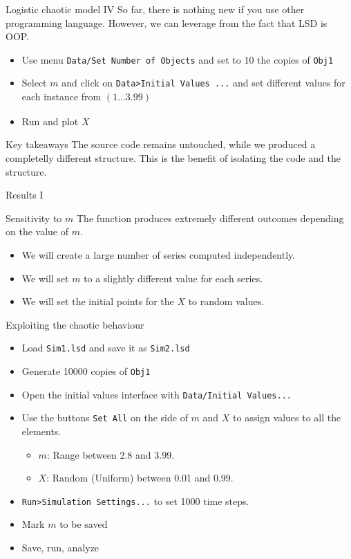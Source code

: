 \documentclass[bigger,aspectratio=169]{beamer}
\begin{document}
\begin{frame}[label={sec:orga6ac1ef},fragile]{Logistic chaotic model IV}
 So far, there is nothing new if you use other programming language.
However, we can leverage from the fact that LSD is OOP.

\begin{itemize}
\item Use menu \texttt{Data/Set Number of Objects} and set to 10 the copies of \texttt{Obj1}
\item Select \(m\) and click on \texttt{Data>Initial Values ...} and set different values for each instance from \((1 \ldots 3.99)_{}\)
\item Run and plot \(X\)
\end{itemize}
\begin{block}{Key takeaways}
The source code remains untouched, while we produced a completelly different structure.
This is the benefit of isolating the code and the structure.
\end{block}
\end{frame}
\begin{frame}[label={sec:org96a401d}]{Results I}
\begin{center}

\end{center}
\end{frame}
\begin{frame}[label={sec:org313bff8}]{Sensitivity to \(m\)}
The function produces \alert{extremely} different outcomes depending on the value of \alert{\(m\)}.

\begin{itemize}
\item We will create a large number of series computed independently.
\item We will set \(m\) to a slightly different value for each series.
\item We will set the \alert{initial} points for the \(X\) to random values.
\end{itemize}
\end{frame}
\begin{frame}[label={sec:orgd722c33},fragile]{Exploiting the chaotic behaviour}
 \begin{itemize}
\item Load \texttt{Sim1.lsd} and save it as \texttt{Sim2.lsd}
\item Generate \alert{10000} copies of \texttt{Obj1}
\item Open the initial values interface with \texttt{Data/Initial Values...}
\item Use the buttons \texttt{Set All} on the side of \(m\) and \(X\) to assign values to all the elements.
\begin{itemize}
\item \(m\): \alert{Range} between 2.8 and 3.99.
\item \(X\): Random (Uniform) between 0.01 and 0.99.
\end{itemize}
\item \texttt{Run>Simulation Settings...} to set 1000 time steps.
\item Mark \(m\) to be saved
\item Save, run, analyze
\end{itemize}
\end{frame}
\end{document}
